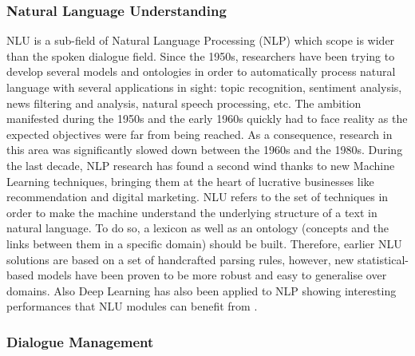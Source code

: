                         \subsubsection{Natural Language Understanding}
                        
                        NLU is a sub-field of Natural Language Processing (NLP) which scope is wider than the spoken dialogue field. Since the 1950s, researchers have been trying to develop several models and ontologies in order to automatically process natural language with several applications in sight: topic recognition, sentiment analysis, news filtering and analysis, natural speech processing, etc. The ambition manifested during the 1950s and the early 1960s quickly had to face reality as the expected objectives were far from being reached. As a consequence, research in this area was significantly slowed down between the 1960s and the 1980s. During the last decade, NLP research has found a second wind thanks to new Machine Learning techniques, bringing them at the heart of lucrative businesses like recommendation and digital marketing. NLU refers to the set of techniques in order to make the machine understand the underlying structure of a text in natural language. To do so, a lexicon as well as an ontology (concepts and the links between them in a specific domain) should be built. Therefore, earlier NLU solutions are based on a set of handcrafted parsing rules, however, new statistical-based models \cite{Macherey2009,Hahn2010} have been proven to be more robust and easy to generalise over domains. Also Deep Learning has also been applied to NLP showing interesting performances that NLU modules can benefit from \cite{Bengio2003,Collobert2011,Ferreira2015a,Ferreira2015b,Ferreira2016}.

                        \subsubsection{Dialogue Management}
                        

